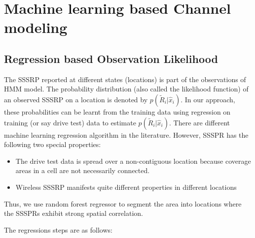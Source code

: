 \documentclass[conference, 10pt]{IEEEtran}
\begin{document}
\section{Machine learning based Channel modeling}
\label{sec:channel-model}
\subsection{Regression based Observation Likelihood}
\label{sec:prob-reg}
The SSSRP reported at different states
(locations) is part of the observations of HMM model. The probability
distribution (also called the likelihood function) of an observed SSSRP on a location is denoted by
$p(\tilde{R}_i|\hat{x}_{i})$. In our approach, these probabilities
can be learnt from the training data using regression on training (or say drive test) data to
estimate $p(\tilde{R}_i|\hat{x}_{i})$. There are different machine learning regression algorithm in the literature.
However, SSSPR has the following two special properties:
\begin{itemize}
	\item The drive test data is spread over a non-contiguous location because coverage
	areas in a cell are not necessarily connected.
	\item  Wireless SSSRP manifests quite different properties in different locations
\end{itemize}

Thus, we use random forest regressor to segment the area into locations where the SSSPRs
exhibit strong spatial correlation. 

The regressions steps are as follows:
\end{document}
